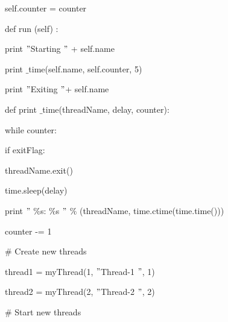 \documentclass{wileySix}
\begin{document}


\newpage

{\fontsize{9pt}{9pt}\selectfont self.counter = counter} \par
\noindent 
{\fontsize{9pt}{9pt}\selectfont def run (self) :} \par
\noindent 
{\fontsize{9pt}{9pt}\selectfont  \hspace*{0.5in} print  $ " $Starting  $ " $ + self.name} \par
\noindent 
{\fontsize{9pt}{9pt}\selectfont  \hspace*{0.5in} print $  \_  $time(self.name, self.counter, 5)} \par
\noindent 
{\fontsize{9pt}{9pt}\selectfont  \hspace*{0.5in} print  $ " $Exiting  $ " $+ self.name} \par
\vspace{9pt}
\noindent 
{\fontsize{9pt}{9pt}\selectfont def print $  \_  $time(threadName, delay, counter):} \par
\noindent 
{\fontsize{9pt}{9pt}\selectfont while counter:} \par
\noindent 
{\fontsize{9pt}{9pt}\selectfont  \hspace*{0.5in} if exitFlag:} \par
\noindent 
{\fontsize{9pt}{9pt}\selectfont  \hspace*{0.5in}  \hspace*{0.5in} threadName.exit()} \par
\noindent 
{\fontsize{9pt}{9pt}\selectfont  \hspace*{0.5in} time.sleep(delay)} \par
\noindent 
{\fontsize{9pt}{9pt}\selectfont  \hspace*{0.5in} print  $ " $ $  \%  $s:  $  \%  $s $ " $  $  \%  $ (threadName, time.ctime(time.time()))} \par
\noindent 
{\fontsize{9pt}{9pt}\selectfont counter -= 1} \par
\vspace{9pt}
\noindent 
{\fontsize{9pt}{9pt}\selectfont  $  \#  $ Create new threads} \par
\noindent 
{\fontsize{9pt}{9pt}\selectfont thread1 = myThread(1,  $ " $Thread-1 $ " $, 1)} \par
\noindent 
{\fontsize{9pt}{9pt}\selectfont thread2 = myThread(2,  $ " $Thread-2 $ " $, 2)} \par
\vspace{9pt}
\noindent 
{\fontsize{9pt}{9pt}\selectfont  $  \#  $ Start new threads} \par
\end{document}
